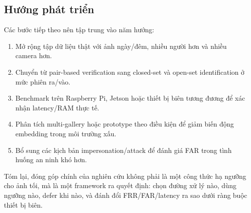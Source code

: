 \subsection{Hướng phát triển}

Các bước tiếp theo nên tập trung vào năm hướng:

\begin{enumerate}
    \item Mở rộng tập dữ liệu thật với ảnh ngày/đêm, nhiều người hơn và nhiều camera hơn.
    \item Chuyển từ pair-based verification sang closed-set và open-set identification ở mức phiên ra/vào.
    \item Benchmark trên Raspberry Pi, Jetson hoặc thiết bị biên tương đương để xác nhận latency/RAM thực tế.
    \item Phân tích multi-gallery hoặc prototype theo điều kiện để giảm biến động embedding trong môi trường xấu.
    \item Bổ sung các kịch bản impersonation/attack để đánh giá FAR trong tình huống an ninh khó hơn.
\end{enumerate}

Tóm lại, đóng góp chính của nghiên cứu không phải là một công thức hạ ngưỡng cho ảnh tối, mà là một framework ra quyết định: chọn đường xử lý nào, dùng ngưỡng nào, defer khi nào, và đánh đổi FRR/FAR/latency ra sao dưới ràng buộc thiết bị biên.
